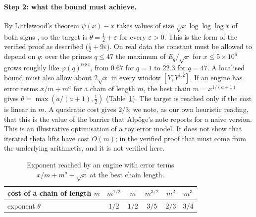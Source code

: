 \documentclass[11pt,a4paper]{article}
\theoremstyle{definition}\newtheorem{definition}[proposition]{Definition}
\theoremstyle{remark}\newtheorem{remark}[proposition]{Remark}
\begin{document}
\paragraph{Step 2: what the bound must achieve.} By Littlewood's theorem $\psi(x)-x$ takes values of size $\sqrt x\log\log\log x$ of both signs \cite{Littlewood1914}, so the target is $\theta=\tfrac12+\varepsilon$ for every $\varepsilon>0$. This is the form of the verified proof as described ($\tfrac12+9\varepsilon$). On real data the constant must be allowed to depend on $q$: over the primes $q\le47$ the maximum of $E_q/\sqrt x$ for $x\le5\times10^6$ grows roughly like $\varphi(q)^{0.84}$, from $0.67$ for $q=1$ to $22.3$ for $q=47$. A localised bound must also allow about $2\sqrt x$ in every window $[Y,Y^{1.2}]$. If an engine has error terms $x/m+m^a$ for a chain of length $m$, the best chain $m=x^{1/(a+1)}$ gives $\theta=\max(a/(a+1),\tfrac12)$ (Table~\ref{tab:arith}). The target is reached only if the cost is linear in $m$. A quadratic cost gives $2/3$; we note, as our own heuristic reading, that this is the value of the barrier that Alp\"oge's note reports for a naive version. This is an illustrative optimisation of a toy error model. It does not show that iterated theta lifts have cost $O(m)$; in the verified proof that must come from the underlying arithmetic, and it is not verified here.

\begin{table}[ht]\centering\small
\caption{Exponent reached by an engine with error terms $x/m+m^a+\sqrt x$ at the best chain length.}\label{tab:arith}
\begin{tabular}{lccccc}
\toprule
cost of a chain of length $m$ & $m^{1/2}$ & $m$ & $m^{3/2}$ & $m^2$ & $m^3$\\
\midrule
exponent $\theta$ & $1/2$ & $1/2$ & $3/5$ & $2/3$ & $3/4$\\
\bottomrule
\end{tabular}
\end{table}
\end{document}
